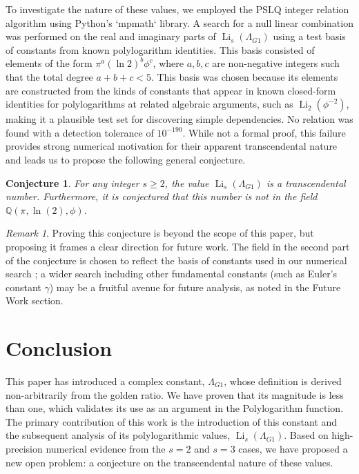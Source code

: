 \documentclass{amsart}
\theoremstyle{plain}
\newtheorem{conjecture}[theorem]{Conjecture}
\theoremstyle{definition}
\theoremstyle{remark}
\newtheorem*{remark}{Remark}
\DeclareMathOperator{\Li}{Li} %
\newcommand{\LambdaG}{\Lambda_{G1}}
\newcommand{\phiG}{\phi}
\begin{document}
To investigate the nature of these values, we employed the PSLQ integer relation algorithm using Python's `mpmath` library. A search for a null linear combination was performed on the real and imaginary parts of $\Li_s(\LambdaG)$ using a test basis of constants from known polylogarithm identities. This basis consisted of elements of the form $\pi^a (\ln 2)^b \phiG^c$, where $a,b,c$ are non-negative integers such that the total degree $a+b+c < 5$. This basis was chosen because its elements are constructed from the kinds of constants that appear in known closed-form identities for polylogarithms at related algebraic arguments, such as $\Li_2(\phiG^{-2})$, making it a plausible test set for discovering simple dependencies. No relation was found with a detection tolerance of $10^{-190}$. While not a formal proof, this failure provides strong numerical motivation for their apparent transcendental nature and leads us to propose the following general conjecture.
\begin{conjecture}
For any integer $s \ge 2$, the value $\Li_s(\LambdaG)$ is a transcendental number. Furthermore, it is conjectured that this number is not in the field $\mathbb{Q}(\pi, \ln(2), \phiG)$.
\end{conjecture}
\begin{remark}
Proving this conjecture is beyond the scope of this paper, but proposing it frames a clear direction for future work. The field in the second part of the conjecture is chosen to reflect the basis of constants used in our numerical search ; a wider search including other fundamental constants (such as Euler's constant $\gamma$) may be a fruitful avenue for future analysis, as noted in the Future Work section.
\end{remark}

\section{Conclusion}
This paper has introduced a complex constant, $\LambdaG$, whose definition is derived non-arbitrarily from the golden ratio. We have proven that its magnitude is less than one, which validates its use as an argument in the Polylogarithm function. The primary contribution of this work is the introduction of this constant and the subsequent analysis of its polylogarithmic values, $\Li_s(\LambdaG)$. Based on high-precision numerical evidence from the $s=2$ and $s=3$ cases, we have proposed a new open problem: a conjecture on the transcendental nature of these values.
\end{document}
